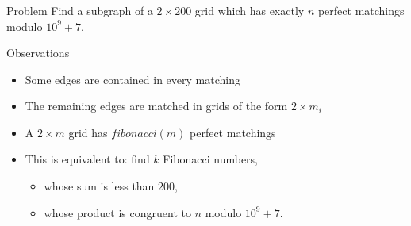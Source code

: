 \begin{frame}
  \frametitle{\problemtitle}
  \begin{block}{Problem}
  	Find a subgraph of a $2\times200$ grid which has exactly $n$ perfect matchings modulo $10^9+7$.
  \end{block}
  \begin{center}
  \end{center}
  \pause
  \begin{block}{Observations}
  \begin{itemize}
  	\item Some edges are contained in every matching
  	\item The remaining edges are matched in grids of the form $2\times m_i$
  	\item A $2\times m$ grid has $\mathit{fibonacci}(m)$ perfect matchings
  	\pause
  	\item This is equivalent to: find $k$ Fibonacci numbers,
  	\begin{itemize}
  		\item whose sum is less than $200$,
  		\item whose product is congruent to $n$ modulo $10^9+7$.
  	\end{itemize}
  \end{itemize}
  \end{block}
\end{frame}
\newcommand{\fib}[1]{\mathit{fib}(#1)}
